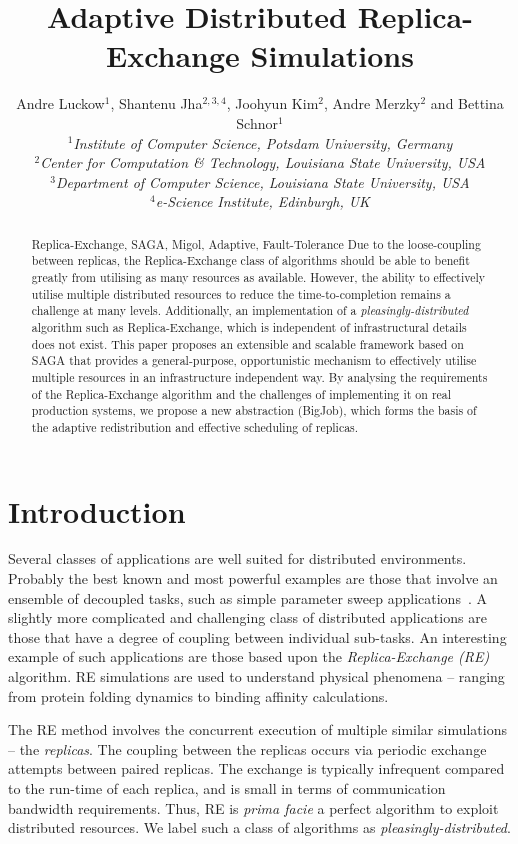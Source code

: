 \documentclass{rspublic}
\title[Adaptive Distributed Replica-Exchange Simulations]{Adaptive Distributed
  Replica-Exchange Simulations}
\author[Luckow, Jha, Kim, Merzky, Schnor]{
  Andre Luckow$^{1}$, Shantenu Jha$^{2,3,4}$, Joohyun Kim$^{2}$, Andre Merzky$^{2}$ and Bettina Schnor$^{1}$\\
  \small{\emph{$^{1}$Institute of Computer Science, Potsdam University, Germany}}\\
  \small{\emph{$^{2}$Center for Computation \& Technology, Louisiana State University, USA}}\\
  \small{\emph{$^{3}$Department of Computer Science, Louisiana State
      University, USA}}\\
  \small{\emph{$^{4}$e-Science Institute, Edinburgh, UK}}\\
}
\begin{document}
 

\maketitle    


\begin{abstract}{Replica-Exchange, SAGA, Migol, Adaptive, Fault-Tolerance}  
  Due to the loose-coupling between replicas, the Replica-Exchange
  class of algorithms should be able to benefit greatly from utilising
  as many resources as available. However, the ability to effectively
  utilise multiple distributed resources to reduce the
  time-to-com\-ple\-tion remains a challenge at many levels.
  Additionally, an implementation of a {\it pleasingly-distributed}
  algorithm such as Replica-Exchange, which is independent of
  infrastructural details does not exist.  This paper proposes an
  extensible and scalable framework based on SAGA that provides a
  general-purpose, opportunistic mechanism to effectively utilise
  multiple resources in an infrastructure independent way. By
  analysing the requirements of the Replica-Exchange algorithm and the
  challenges of implementing it on real production systems, we propose
  a new abstraction (BigJob), which forms the basis of the adaptive
  redistribution and effective scheduling of replicas.
\end{abstract}

\section{Introduction}

Several classes of applications are well suited for distributed
environments. Probably the best known and most powerful examples are
those that involve an ensemble of decoupled tasks, such as simple
parameter sweep applications~\citep{1239909}.  A slightly more
complicated and challenging class of distributed applications are
those that have a degree of coupling between individual sub-tasks.  An
interesting example of such applications are those based upon the
\emph{Replica-Exchange (RE)}~\citep{hansmann,Sugita:1999rm} algorithm.
RE simulations are used to understand physical phenomena -- ranging
from protein folding dynamics to binding affinity calculations.

The RE method involves the concurrent execution of multiple similar
simulations -- the \emph{replicas}. The coupling between the replicas
occurs via periodic exchange attempts between paired replicas. The
exchange is typically infrequent compared to the run-time of each
replica, and is small in terms of communication bandwidth
requirements. Thus, RE is {\it prima facie} a perfect algorithm to
exploit distributed resources. We label such a class of algorithms as
{\it pleasingly-distributed}.
\end{document}
